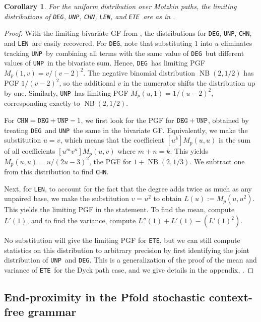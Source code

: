 \documentclass{article}
\DeclareMathOperator{\NB}{NB}
\newtheorem{cor}[theorem]{Corollary}
\newcommand{\DEG}{{\tt DEG}}
\newcommand{\UNP}{{\tt UNP}}
\newcommand{\ETE}{{\tt ETE}}
\newcommand{\COV}{{\tt CHN}}
\newcommand{\LEN}{{\tt LEN}}
\begin{document}
\begin{cor} \label{cor:Motzkin}
    For the uniform distribution over Motzkin paths, the limiting distributions of \DEG, \UNP, \COV, \LEN, and \ETE\ are as in .
\end{cor}

\begin{proof}
    With the limiting bivariate GF from , the distributions for \DEG, \UNP, \COV, and \LEN\ are easily recovered.  For \DEG, note that substituting $1$ into $u$ eliminates tracking \UNP\ by combining all terms with the same value of \DEG\ but different values of \UNP\ in the bivariate sum.  Hence, \DEG\ has limiting PGF $M_p(1, v) = v/(v-2)^2$. The negative binomial distribution $\NB(2, 1/2)$ has PGF $1/(v-2)^2$, so the additional $v$ in the numerator shifts the distribution up by one.  Similarly, \UNP\ has limiting PGF $M_p(u, 1) = 1/(u-2)^2$, corresponding exactly to $\NB(2, 1/2)$.

    For $\COV = \DEG + \UNP - 1$, we first look for the PGF for $\DEG + \UNP$, obtained by treating \DEG\ and \UNP\ the same in the bivariate GF.  Equivalently, we make the substitution $u = v$, which means that the coefficient $[u^k]M_p(u, u)$ is the sum of all coefficients $[u^m v^n] M_p(u, v)$ where $m + n = k$.  This yields $M_p(u, u) = u/(2u-3)^2$, the PGF for $1 + \NB(2, 1/3)$.  We subtract one from this distribution to find \COV.

    Next, for \LEN, to account for the fact that the degree adds twice as much as any unpaired base, we make the substitution $v = u^2$ to obtain $L(u) := M_p(u, u^2)$.  This yields the limiting PGF in the statement.  To find the mean, compute $L'(1)$, and to find the variance, compute $L''(1) + L'(1) - (L'(1)^2).$

    No substitution will give the limiting PGF for \ETE, but we can still compute statistics on this distribution to arbitrary precision by first identifying the joint distribution of \UNP\ and \DEG.  This is a generalization of the proof of the mean and variance of \ETE\ for the Dyck path case, and we give details in the appendix, .
    
    

\end{proof}

\subsection{End-proximity in the Pfold stochastic context-free grammar} \label{sec:Pfold}
\end{document}
